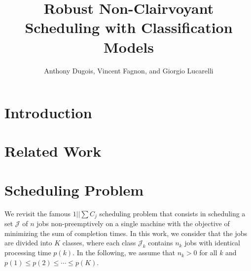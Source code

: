 \documentclass{article}
\title{Robust Non-Clairvoyant Scheduling with Classification Models}
\author{Anthony Dugois, Vincent Fagnon, and Giorgio Lucarelli}
\date{}
\begin{document}
\maketitle

\section{Introduction}

\section{Related Work}

\section{Scheduling Problem}

We revisit the famous \(1||\sum C_j\) scheduling problem that consists in
scheduling a set \(\mathcal{J}\) of \(n\) jobs non-preemptively on a single
machine with the objective of minimizing the sum of completion times.  
In this work, we consider that the jobs are divided into \(K\) classes, where
each class \(\mathcal{J}_k\) contains \(n_k\) jobs with identical processing
time \(p(k)\).  
In the following, we assume that \(n_k>0\) for all \(k\) and \(p(1)\le
p(2)\le\cdots\le p(K)\).
\end{document}
